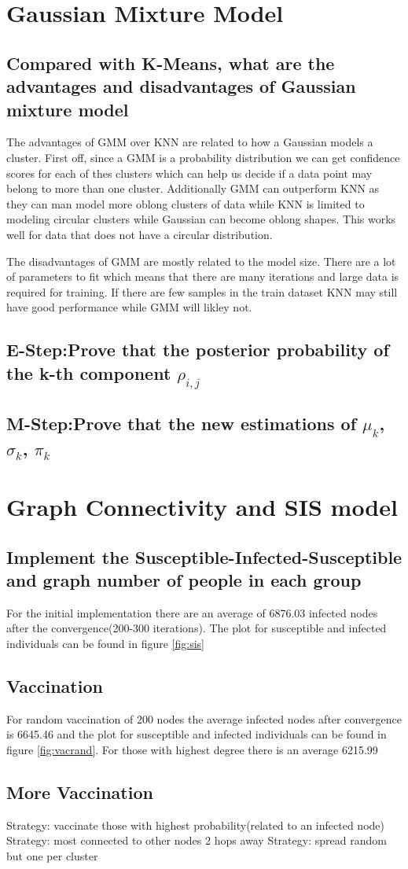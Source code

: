 \documentclass[11pt]{article}
\begin{document}
\section{Gaussian Mixture Model}
\subsection{Compared with K-Means, what are the advantages and disadvantages of Gaussian mixture model}
The advantages of GMM over KNN are related to how a Gaussian models a cluster. First off, since a GMM is a probability distribution we can get confidence scores for each of thes clusters which can help us decide if a data point may belong to more than one cluster. Additionally GMM can outperform KNN as they can man model more oblong clusters of data while KNN is limited to modeling circular clusters while Gaussian can become oblong shapes. This works well for data that does not have a circular distribution.  

The disadvantages of GMM are mostly related to the model size. There are a lot of parameters to fit which means that there are many iterations and large data is required for training. If there are few samples in the train dataset KNN may still have good performance while GMM will likley not.
\subsection{E-Step:Prove that the posterior probability of the k-th component $\rho_{i,j}$}
\subsection{M-Step:Prove that the new estimations of $\mu_k$, $\sigma_k$, $\pi_k$}
\section{Graph Connectivity and SIS model}
\subsection{Implement the Susceptible-Infected-Susceptible and graph number of people in each group}
For the initial implementation there are an average of 6876.03 infected nodes
after the convergence(200-300 iterations). The plot for susceptible and infected individuals can be found  in figure \ref{fig:sis}
\subsection{Vaccination}
For random vaccination of 200 nodes the average infected nodes after convergence is 6645.46 and the plot for susceptible and infected individuals can be found  in figure \ref{fig:vacrand}.
For those with highest degree there is an average  6215.99
\subsection{More Vaccination}
Strategy: vaccinate those with highest probability(related to an infected node)
Strategy: most connected to other nodes 2 hops away
Strategy: spread random but one per cluster
\end{document}
